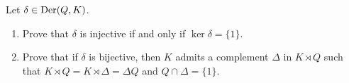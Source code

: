\begin{prob}
	\label{xca:ker1cocycle}
	Let $\delta\in\operatorname{Der}(Q,K)$. 
	\begin{enumerate}
	\item Prove that $\delta$ is injective if and only if 
	$\ker\delta=\{1\}$.
	\item Prove that if $\delta$ is bijective, then  
	$K$ admits a complement 
	$\Delta$ in $K\rtimes Q$ such that $K\rtimes Q=K\rtimes\Delta=\Delta Q$ and 
	$Q\cap\Delta=\{1\}$.
	\end{enumerate}
\end{prob}



